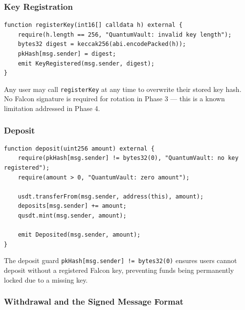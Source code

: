 \documentclass[11pt,a4paper]{article}
\begin{document}
\subsubsection{Key Registration}

\begin{lstlisting}[style=solidity, caption={registerKey implementation}]
function registerKey(int16[] calldata h) external {
    require(h.length == 256, "QuantumVault: invalid key length");
    bytes32 digest = keccak256(abi.encodePacked(h));
    pkHash[msg.sender] = digest;
    emit KeyRegistered(msg.sender, digest);
}
\end{lstlisting}

Any user may call \texttt{registerKey} at any time to overwrite their stored key hash. No Falcon signature is required for rotation in Phase 3 --- this is a known limitation addressed in Phase 4.

\subsubsection{Deposit}

\begin{lstlisting}[style=solidity, caption={deposit implementation}]
function deposit(uint256 amount) external {
    require(pkHash[msg.sender] != bytes32(0), "QuantumVault: no key registered");
    require(amount > 0, "QuantumVault: zero amount");

    usdt.transferFrom(msg.sender, address(this), amount);
    deposits[msg.sender] += amount;
    qusdt.mint(msg.sender, amount);

    emit Deposited(msg.sender, amount);
}
\end{lstlisting}

The deposit guard \texttt{pkHash[msg.sender] != bytes32(0)} ensures users cannot deposit without a registered Falcon key, preventing funds being permanently locked due to a missing key.

\subsubsection{Withdrawal and the Signed Message Format}
\end{document}
